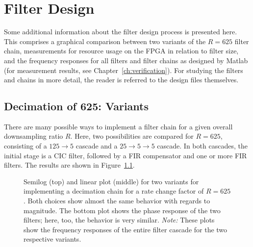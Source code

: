 %
%
\chapter{Filter Design} %
\label{ch:app:fdesign}

Some  additional information  about  the filter  design  process is  presented
here. This  comprises  a graphical  comparison  between  two variants  of  the
$R=625$  filter  chain,  measurements  for  resource  usage  on  the  FPGA  in
relation  to  filter  size,  and  the  frequency  responses  for  all  filters
and  filter  chains  as  designed  by Matlab  (for  measurement  results,  see
Chapter~\ref{ch:verification}). For studying  the filters  and chains  in more
detail, the reader is referred to the design files themselves.

%
%
\section{Decimation of 625: Variants} %
\label{sec:dec625_variants}

There are many possible  ways to implement a filter chain  for a given overall
downsampling  ratio $R$. Here,  two  possibilities are  compared for  $R=625$,
consisting  of  a  $125  \rightarrow  5$  cascade  and  a  $25  \rightarrow  5
\rightarrow 5$ cascade. In  both cascades, the initial stage is  a CIC filter,
followed by  a FIR compensator  and one or  more FIR filters. The  results are
shown in Figure~\ref{fig:dec625_variants}.

\begin{figure}
    \centering
    
    \caption[Decimation Chain Variants for Rate of 625]{%
        Semilog  (top)  and   linear  plot  (middle)  for   two  variants  for
        implementing  a  decimation   chain  for  a  rate   change  factor  of
        $R=625$. Both choices  show almost the  same behavior with  regards to
        magnitude. The  bottom  plot  shows  the phase  response  of  the  two
        filters; here, too, the behavior  is very similar. \emph{Note:}  These
        plots show  the frequency responses  of the entire filter  cascade for
        the two respective variants.%
    }
    \label{fig:dec625_variants}
\end{figure}

